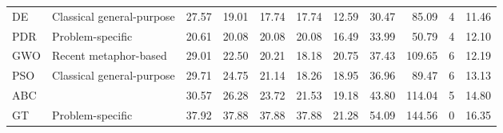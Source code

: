 \begin{table}[pos=htbp]
{\begin{tabular}{llrrrrrrrrr}
DE & Classical general-purpose & 27.57 & 19.01 & 17.74 & 17.74 & 12.59 & 30.47 & 85.09 & 4 & 11.46 \\
PDR & Problem-specific & 20.61 & 20.08 & 20.08 & 20.08 & 16.49 & 33.99 & 50.79 & 4 & 12.10 \\
GWO & Recent metaphor-based & 29.01 & 22.50 & 20.21 & 18.18 & 20.75 & 37.43 & 109.65 & 6 & 12.19 \\
PSO & Classical general-purpose & 29.71 & 24.75 & 21.14 & 18.26 & 18.95 & 36.96 & 89.47 & 6 & 13.13 \\
ABC &  & 30.57 & 26.28 & 23.72 & 21.53 & 19.18 & 43.80 & 114.04 & 5 & 14.80 \\
GT & Problem-specific & 37.92 & 37.88 & 37.88 & 37.88 & 21.28 & 54.09 & 144.56 & 0 & 16.35 \\
\bottomrule
\end{tabular}}
\end{table}

